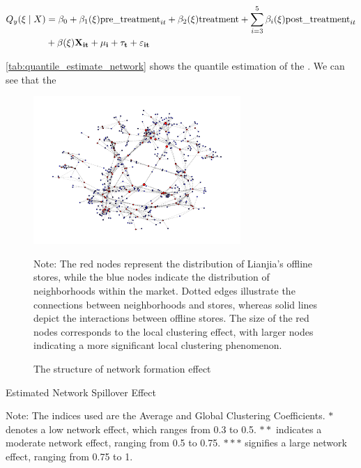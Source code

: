 \documentclass[11pt]{article}
\begin{document}
\begin{equation}
  \begin{aligned}
    Q_y(\xi \mid X) & = \beta_0 + \beta_1(\xi) \text{pre\_treatment}_{it} + \beta_2(\xi) \text{treatment} + \sum_{i=3}^5 \beta_i(\xi) \text{post\_treatment}_{it} \\
    & + \beta(\xi) \bf{X}_{it} + \mu_i + \tau_t + \varepsilon_{it}
  \end{aligned}
\end{equation}

\ref{tab:quantile_estimate_network} shows the quantile estimation of the . We can see that the 





\begin{figure}
  \centering
  \includegraphics[width=0.7\textwidth]{../figures/network_formation_effect.pdf}
  \caption{The structure of network formation effect}
  \label{fig:network_formation_effect_graph}

  Note: The red nodes represent the distribution of Lianjia's offline stores, while the blue nodes indicate the distribution of neighborhoods within the market. Dotted edges illustrate the connections between neighborhoods and stores, whereas solid lines depict the interactions between offline stores. The size of the red nodes corresponds to the local clustering effect, with larger nodes indicating a more significant local clustering phenomenon.
\end{figure}

\begin{table}
  \begin{center}
    \begin{scriptsize}
      \caption{Estimated Network Spillover Effect}
      \label{tab:estiamted_spillover_effect}
      

      Note: The indices used are the Average and Global Clustering Coefficients. $*$ denotes a low network effect, which ranges from 0.3 to 0.5. $**$ indicates a moderate network effect, ranging from 0.5 to 0.75. $***$ signifies a large network effect, ranging from 0.75 to 1.
    \end{scriptsize}
  \end{center}
\end{table}
\end{document}
